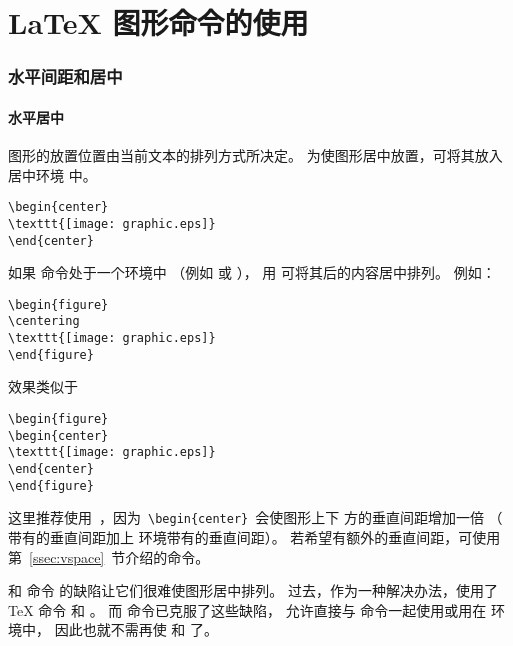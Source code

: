 
\part{\LaTeX{} 图形命令的使用}

\section{水平间距和居中}\label{sec:center}

\subsection{水平居中}\label{ssec:hcenter}
图形的放置位置由当前文本的排列方式所决定。
为使图形居中放置，可将其放入居中环境  中。
\begin{lstlisting}
\begin{center}
\texttt{[image: graphic.eps]}
\end{center}
\end{lstlisting}

如果  命令处于一个环境中
（例如  或 ），
用  可将其后的内容居中排列。
例如：

\begin{lstlisting}
\begin{figure}
\centering
\texttt{[image: graphic.eps]}
\end{figure}
\end{lstlisting}
效果类似于
\begin{lstlisting}
\begin{figure}
\begin{center}
\texttt{[image: graphic.eps]}
\end{center}
\end{figure}
\end{lstlisting}
这里推荐使用~，因为~\verb+\begin{center}+~会使图形上下
方的垂直间距增加一倍
（  带有的垂直间距加上  环境带有的垂直间距）。
若希望有额外的垂直间距，可使用第~\ref{ssec:vspace}~节介绍的命令。

 和  命令
的缺陷让它们很难使图形居中排列。
过去，作为一种解决办法，使用了 \TeX{} 命令  和 。
而  命令已克服了这些缺陷，
允许直接与  命令一起使用或用在  环境中，
因此也就不需再使  和 了。

